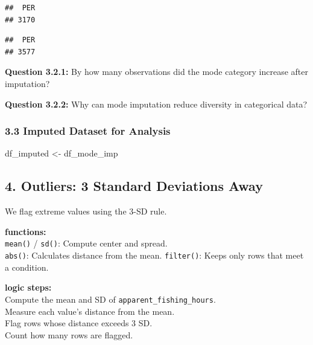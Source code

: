 \documentclass[
]{article}
\newenvironment{Shaded}{\begin{snugshade}}{\end{snugshade}}
\newcommand{\CommentTok}[1]{\textcolor[rgb]{0.56,0.35,0.01}{\textit{#1}}}
\newcommand{\FunctionTok}[1]{\textcolor[rgb]{0.00,0.00,0.00}{#1}}
\newcommand{\NormalTok}[1]{#1}
\newcommand{\OtherTok}[1]{\textcolor[rgb]{0.56,0.35,0.01}{#1}}
\newcommand{\SpecialCharTok}[1]{\textcolor[rgb]{0.00,0.00,0.00}{#1}}
\begin{document}
\begin{verbatim}
##  PER 
## 3170
\end{verbatim}

\begin{Shaded}
\end{Shaded}

\begin{verbatim}
##  PER 
## 3577
\end{verbatim}

\textbf{Question 3.2.1:} By how many observations did the mode category
increase after imputation?

\textbf{Question 3.2.2:} Why can mode imputation reduce diversity in
categorical data?

\hypertarget{imputed-dataset-for-analysis}{%
\subsubsection{3.3 Imputed Dataset for
Analysis}\label{imputed-dataset-for-analysis}}

\begin{Shaded}
\begin{Highlighting}[]
\NormalTok{df\_imputed }\OtherTok{\textless{}{-}}\NormalTok{ df\_mode\_imp}
\end{Highlighting}
\end{Shaded}

\hypertarget{outliers-3-standard-deviations-away}{%
\subsection{4. Outliers: 3 Standard Deviations
Away}\label{outliers-3-standard-deviations-away}}

We flag extreme values using the 3-SD rule.

\textbf{functions:}\\
\texttt{mean()} / \texttt{sd()}: Compute center and spread.\\
\texttt{abs()}: Calculates distance from the mean. \texttt{filter()}:
Keeps only rows that meet a condition.

\textbf{logic steps:}\\
Compute the mean and SD of \texttt{apparent\_fishing\_hours}.\\
Measure each value's distance from the mean.\\
Flag rows whose distance exceeds 3 SD.\\
Count how many rows are flagged.
\end{document}
